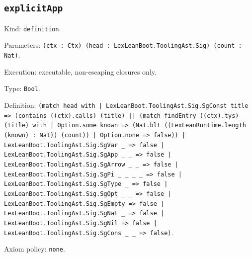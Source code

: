 \documentclass[11pt]{article}
\begin{document}
\subsection*{\texttt{explicitApp}}
\noindent Kind: \texttt{definition}.\par
\noindent Parameters: \texttt{(ctx : Ctx) (head : LexLeanBoot.ToolingAst.Sig) (count : Nat)}.\par
\noindent Execution: executable, non-escaping closures only.\par
\noindent Type: \texttt{Bool}.\par
\noindent Definition: \texttt{(match head with | LexLeanBoot.ToolingAst.Sig.SgConst title => (contains ((ctx).calls) (title) || (match findEntry ((ctx).tys) (title) with | Option.some known => (Nat.blt ((LexLeanRuntime.length (known) : Nat)) (count)) | Option.none => false)) | LexLeanBoot.ToolingAst.Sig.SgVar \_ => false | LexLeanBoot.ToolingAst.Sig.SgApp \_ \_ => false | LexLeanBoot.ToolingAst.Sig.SgArrow \_ \_ => false | LexLeanBoot.ToolingAst.Sig.SgPi \_ \_ \_ \_ => false | LexLeanBoot.ToolingAst.Sig.SgType \_ => false | LexLeanBoot.ToolingAst.Sig.SgOpt \_ \_ => false | LexLeanBoot.ToolingAst.Sig.SgEmpty => false | LexLeanBoot.ToolingAst.Sig.SgNat \_ => false | LexLeanBoot.ToolingAst.Sig.SgNil => false | LexLeanBoot.ToolingAst.Sig.SgCons \_ \_ => false)}.\par
\noindent Axiom policy: \texttt{none}.\par
\end{document}
